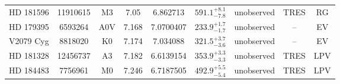 \begin{table*}
\begin{tabular}{ccccccccc}
HD 181596 & 11910615 & M3 & 7.05 & 6.862713 & $591.1^{+8.1}_{-7.8}$ & unobserved & TRES & RG \\
HD 179395 & 6593264 & A0V & 7.168 & 7.0700407 & $233.9^{+1.7}_{-1.7}$ & unobserved & -- & EV \\
V2079 Cyg & 8818020 & K0 & 7.174 & 7.034088 & $321.5^{+3.7}_{-3.6}$ & unobserved & -- & EV \\
HD 181328 & 12456737 & A3 & 7.182 & 6.6139154 & $353.9^{+3.3}_{-3.3}$ & unobserved & TRES & LPV \\
HD 184483 & 7756961 & M0 & 7.246 & 6.7187505 & $492.9^{+5.5}_{-5.4}$ & unobserved & TRES & LPV \\
\hline
\end{tabular}
\end{table*}
